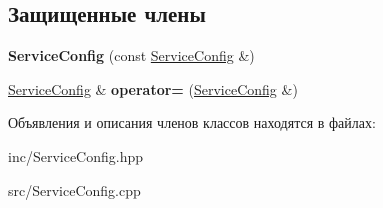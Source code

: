 \subsection*{Защищенные члены}
\begin{DoxyCompactItemize}
\item 
\mbox{\label{classServiceConfig_a7426eeaf74b0ee4e530357266df3f97b}} 
{\bfseries Service\+Config} (const \hyperlink{classServiceConfig}{Service\+Config} \&)
\item 
\mbox{\label{classServiceConfig_ae9a4fa11523b66339e81d7561c27c19f}} 
\hyperlink{classServiceConfig}{Service\+Config} \& {\bfseries operator=} (\hyperlink{classServiceConfig}{Service\+Config} \&)
\end{DoxyCompactItemize}


Объявления и описания членов классов находятся в файлах\+:\begin{DoxyCompactItemize}
\item 
inc/Service\+Config.\+hpp\item 
src/Service\+Config.\+cpp\end{DoxyCompactItemize}
